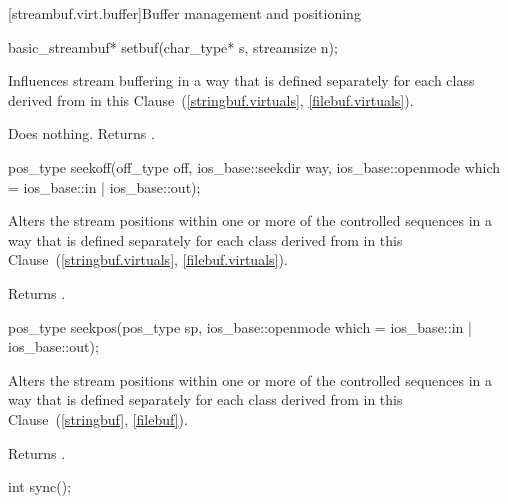 [streambuf.virt.buffer]{Buffer management and positioning}

%
\begin{itemdecl}
basic_streambuf* setbuf(char_type* s, streamsize n);
\end{itemdecl}

\begin{itemdescr}
\pnum
\effects
Influences stream buffering in a way that is defined separately for each class
derived from
in this Clause~(\ref{stringbuf.virtuals},
\ref{filebuf.virtuals}).

\pnum
{}
Does nothing.
Returns
.
\end{itemdescr}

%
\begin{itemdecl}
pos_type seekoff(off_type off, ios_base::seekdir way,
                 ios_base::openmode which
                  = ios_base::in | ios_base::out);
\end{itemdecl}

\begin{itemdescr}
\pnum
\effects
Alters the stream positions within one or more of
the controlled sequences in a way that is defined separately for each class
derived from
in this Clause~(\ref{stringbuf.virtuals},
\ref{filebuf.virtuals}).

\pnum
{}
Returns
.
\end{itemdescr}

%
\begin{itemdecl}
pos_type seekpos(pos_type sp,
                 ios_base::openmode which
                  = ios_base::in | ios_base::out);
\end{itemdecl}

\begin{itemdescr}
\pnum
\effects
Alters the stream positions within one or more of
the controlled sequences in a way that is defined separately for each class
derived from
in this Clause~(\ref{stringbuf},
\ref{filebuf}).

\pnum
{}
Returns
.
\end{itemdescr}

%
\begin{itemdecl}
int sync();
\end{itemdecl}

